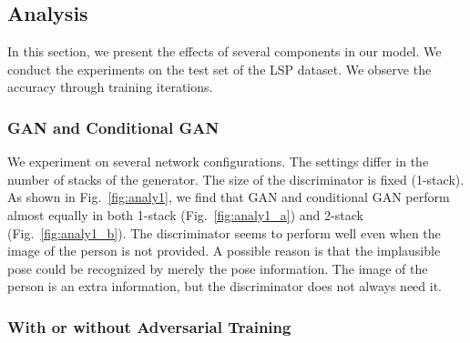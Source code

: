 \documentclass[10pt,twocolumn,letterpaper]{article}
\begin{document}
\subsection{Analysis}

In this section, we present the effects of several components in our model. We conduct the experiments on the test set of the LSP dataset. We observe the accuracy through training iterations. 

\subsubsection{GAN and Conditional GAN}

We experiment on several network configurations. The settings differ in the number of stacks of the generator. The size of the discriminator is fixed (1-stack). As shown in Fig.~\ref{fig:analy1}, we find that GAN and conditional GAN perform almost equally in both 1-stack (Fig.~\ref{fig:analy1_a}) and 2-stack (Fig.~\ref{fig:analy1_b}). The discriminator seems to perform well even when the image of the person is not provided. A possible reason is that the implausible pose could be recognized by merely the pose information. The image of the person is an extra information, but the discriminator does not always need it.
\begin{figure*}[t]
\centering
    \caption{\label{fig:analy1} PCK on the LSP dataset. The blue line is the accuracy of GAN while the green line is of conditional GAN. (a) 1-stack hourglass. (b) 2-stack hourglass. }
 \end{figure*}

\subsubsection{With or without Adversarial Training}
\end{document}
